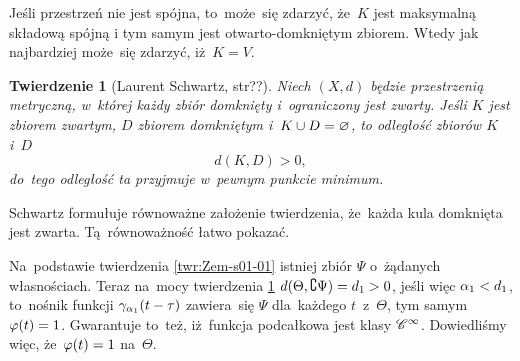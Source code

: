 \documentclass[a4paper,11pt]{article}
\newtheorem{twr}{Twierdzenie} %
\begin{document}
Jeśli przestrzeń nie jest spójna, to~może~się zdarzyć, że~$K$ jest
maksymalną składową spójną i tym samym jest otwarto-domkniętym
zbiorem. Wtedy jak najbardziej może~się zdarzyć, iż~$K = V$.

\begin{twr}[Laurent Schwartz, str??\cite{Sch79}]
  \label{twr:Zem-s01-02}
  Niech $( X, d )$ będzie przestrzenią metryczną, w~której każdy zbiór
  domknięty i~ograniczony jest zwarty. Jeśli $K$ jest zbiorem zwartym,
  $D$ zbiorem domkniętym i~$K \cup D = \varnothing$, to odległość zbiorów $K$
  i~$D$
  \begin{equation}
    \label{eq:Zem-s01-05}
    d( K, D ) > 0,
  \end{equation}
  do~tego odległość ta przyjmuje w~pewnym punkcie minimum.
\end{twr}
\noi Schwartz formułuje równoważne założenie twierdzenia, że~każda
kula domknięta jest zwarta. Tą~równoważność łatwo pokazać.

\start {}  Na~podstawie
twierdzenia \ref{twr:Zem-s01-01} istniej zbiór $\Psi$ o~żądanych
własnościach. Teraz na~mocy twierdzenia \ref{twr:Zem-s01-02}
$d( \Theta, \complement \Psi ) = d_{ 1 } > 0$, jeśli więc
$\alpha_{ 1 } < d_{ 1 }$, to~nośnik funkcji
$\gamma_{ \alpha_{ 1 } }( t - \tau )$ zawiera~się $\Psi$ dla~każdego
$t$~z~$\Theta$, tym samym $\varphi( t ) = 1$. Gwarantuje to~też,
iż~funkcja podcałkowa jest klasy $\mathcal{C}^{ \infty }$. Dowiedliśmy więc,
że~$\varphi( t ) = 1$ na~$\Theta$.
\end{document}
